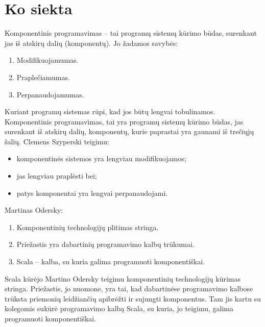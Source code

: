 \section{Ko siekta}

\begin{frame}
  Komponentinis programavimas – tai programų sistemų kūrimo būdas,
  surenkant jas iš atskirų dalių (komponentų). Jo žadamos savybės:
  \begin{enumerate}
    \item Modifikuojamumas.
    \item Praplečiamumas.
    \item Perpanaudojamumas.
  \end{enumerate}
  \begin{handout}
    Kuriant programų sistemas rūpi, kad jos būtų lengvai tobulinamos.
    Komponentinis programavimas, tai yra programų sistemų kūrimo
    būdas, jas surenkant iš atskirų dalių, komponentų, kurie
    paprastai yra gaunami iš trečiųjų šalių. Clemens Szyperski
    teigimu:
    \begin{itemize}
      \item komponentinės sistemos yra lengviau modifikuojamos;
      \item jas lengviau praplėsti bei;
      \item patys komponentai yra lengvai perpanaudojami.
    \end{itemize}
  \end{handout}
\end{frame}

\begin{frame}
  Martinas Odersky:
  \begin{enumerate}
    \item Komponentinių technologijų plitimas stringa.
    \item Priežastis yra dabartinių programavimo kalbų trūkumai.
    \item Scala – kalba, su kuria galima programuoti komponentiškai.
  \end{enumerate}
  \begin{handout}
    Scala kūrėjo Martino Odersky teigimu komponentinių technologijų
    kūrimas stringa. Priežastis, jo nuomone, yra tai, kad dabartinėse
    programavimo kalbose trūksta priemonių leidžiančių apibrėžti
    ir sujungti komponentus. Tam jis kartu su kolegomis sukūrė
    programavimo kalbą Scala, su kuria, jo teigimu, galima
    programuoti komponentiškai.
  \end{handout}
\end{frame}

